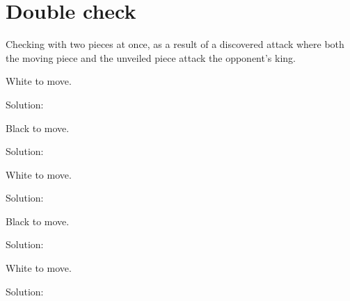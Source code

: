\documentclass{book}
\begin{document}
\section{Double check}
Checking with two pieces at once, as a result of a discovered attack where both the moving piece and the unveiled piece attack the opponent's king.\begin{multicols}{2} 
\begin{samepage} 
\newgame 


 
\showboard
 
 White to move. 
 
Solution: 
 
\end{samepage}\begin{samepage} 
\newgame 


 
\showboard
 
 Black to move. 
 
Solution: 
 
\end{samepage}\begin{samepage} 
\newgame 


 
\showboard
 
 White to move. 
 
Solution: 
 
\end{samepage}\begin{samepage} 
\newgame 


 
\showboard
 
 Black to move. 
 
Solution: 
 
\end{samepage}\begin{samepage} 
\newgame 


 
\showboard
 
 White to move. 
 
Solution: 
 
\end{samepage}\end{multicols} 
\newpage 
\end{document}
